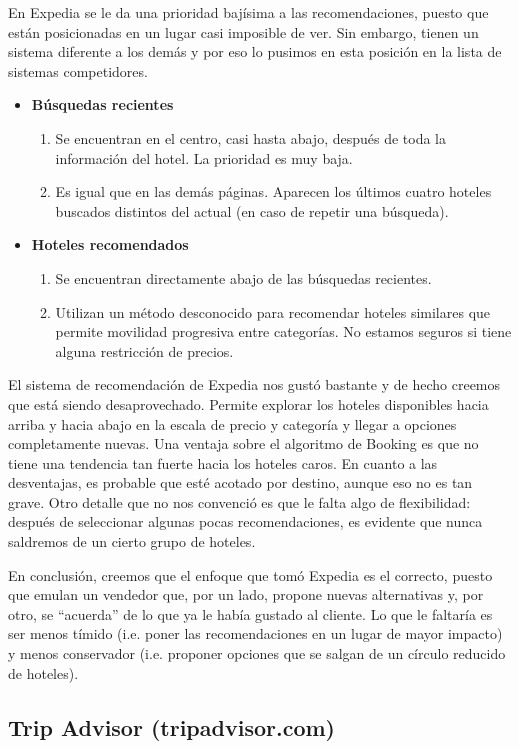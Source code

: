 \documentclass[12pt]{report}
\begin{document}
En Expedia se le da una prioridad bajísima a las recomendaciones, puesto que están posicionadas en un lugar casi imposible de ver. Sin embargo, tienen un sistema diferente a los demás y por eso lo pusimos en esta posición en la lista de sistemas competidores.
\begin{itemize}
	\item \textbf{Búsquedas recientes}
	\begin{enumerate}
		\item Se encuentran en el centro, casi hasta abajo, después de toda la información del hotel. La prioridad es muy baja.
		\item Es igual que en las demás páginas. Aparecen los últimos cuatro hoteles buscados distintos del actual (en caso de repetir una búsqueda).
	\end{enumerate}
	\item \textbf{Hoteles recomendados}
	\begin{enumerate}
		\item Se encuentran directamente abajo de las búsquedas recientes.
		\item Utilizan un método desconocido para recomendar hoteles similares que permite movilidad progresiva entre categorías. No estamos seguros si tiene alguna restricción de precios.
	\end{enumerate}
\end{itemize}
El sistema de recomendación de Expedia nos gustó bastante y de hecho creemos que está siendo desaprovechado. Permite explorar los hoteles disponibles hacia arriba y hacia abajo en la escala de precio y categoría y llegar a opciones completamente nuevas. Una ventaja sobre el algoritmo de Booking es que no tiene una tendencia tan fuerte hacia los hoteles caros. En cuanto a las desventajas, es probable que esté acotado por destino, aunque eso no es tan grave. Otro detalle que no nos convenció es que le falta algo de flexibilidad: después de seleccionar algunas pocas recomendaciones, es evidente que nunca saldremos de un cierto grupo de hoteles.

En conclusión, creemos que el enfoque que tomó Expedia es el correcto, puesto que emulan un vendedor que, por un lado, propone nuevas alternativas y, por otro, se ``acuerda'' de lo que ya le había gustado al cliente. Lo que le faltaría es ser menos tímido (i.e. poner las recomendaciones en un lugar de mayor impacto) y menos conservador (i.e. proponer opciones que se salgan de un círculo reducido de hoteles).

\subsection*{Trip Advisor (tripadvisor.com)}
\end{document}
